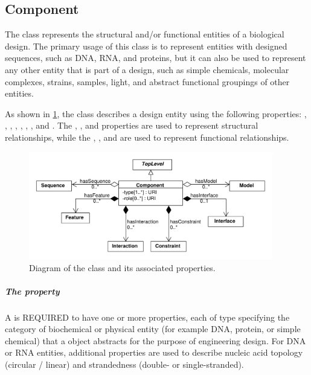 \subsection{Component}
\label{sec:Component}

The  class represents the structural and/or functional entities of a biological design. The primary usage of this class is to represent entities with designed sequences, such as DNA, RNA, and proteins, but it can also be used to represent any other entity that is part of a design, such as simple chemicals, molecular complexes, strains, samples, light, and abstract functional groupings of other entities.

As shown in \ref{uml:component}, the  class describes a design entity using the following properties: , , , , , , , and .  The , , and  properties are used to represent structural relationships, while the , , and  are used to represent functional relationships.

\begin{figure}[ht]
\begin{center}
\includegraphics[width=0.95\textwidth]{uml/component}
\caption[]{Diagram of the  class and its associated properties.}
\label{uml:component}
\end{center}
\end{figure} 

\subparagraph{The  property}
\label{sec:type:CD}

A  is REQUIRED to have one or more  properties, each of type  specifying the category of biochemical or physical entity (for example DNA, protein, or simple chemical) that a  object abstracts
for the purpose of engineering design. For DNA or RNA entities, additional  properties are used to describe nucleic acid topology (circular / linear) and strandedness (double- or single-stranded).


